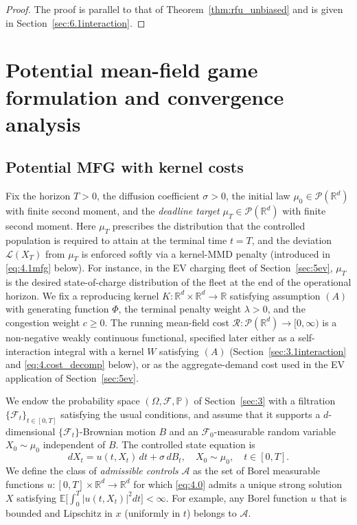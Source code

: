 \documentclass[11pt,leqno]{article}
\theoremstyle{plain}
\theoremstyle{remark}
\theoremstyle{definition}
\numberwithin{equation}{section}
\numberwithin{figure}{section}
\numberwithin{table}{section}
\numberwithin{algorithm}{section}
\newcommand{\EE}{\mathbb{E}}
\newcommand{\RR}{\mathbb{R}}
\newcommand{\PP}{\mathbb{P}}
\newcommand{\cP}{\mathcal{P}}
\begin{document}
\begin{proof}
The proof is parallel to that of Theorem~\ref{thm:rfu_unbiased}
and is given in Section~\ref{sec:6.1interaction}.
\end{proof}


\section{Potential mean-field game formulation and convergence analysis}\label{sec:4}

\subsection{Potential MFG with kernel costs}\label{sec:4.1mfg}

Fix the horizon $T>0$, the diffusion coefficient $\sigma>0$,
the initial law $\mu_0\in\cP(\RR^d)$ with finite second moment,
and the \emph{deadline target} $\mu_T\in\cP(\RR^d)$ with finite second moment.
Here $\mu_T$ prescribes the distribution that the controlled population is required
to attain at the terminal time $t=T$,
and the deviation $\mathcal{L}(X_T)$ from $\mu_T$ is enforced softly via a kernel-MMD penalty
(introduced in \eqref{eq:4.1mfg} below).
For instance, in the EV charging fleet of Section~\ref{sec:5ev},
$\mu_T$ is the desired state-of-charge distribution of the fleet at the end of the operational horizon.
We fix a reproducing kernel $K:\RR^d\times\RR^d\to\RR$ satisfying assumption $(A)$
with generating function $\Phi$, the terminal penalty weight $\lambda>0$, and the congestion weight $c\ge 0$.
The running mean-field cost $\mathcal{R}:\cP(\RR^d)\to[0,\infty)$ is a non-negative weakly continuous functional,
specified later either as a self-interaction integral with a kernel $W$ satisfying $(A)$
(Section~\ref{sec:3.1interaction} and \eqref{eq:4.cost_decomp} below),
or as the aggregate-demand cost used in the EV application of Section~\ref{sec:5ev}.

We endow the probability space $(\Omega,\mathcal{F},\PP)$ of Section~\ref{sec:3}
with a filtration $\{\mathcal{F}_t\}_{t\in[0,T]}$ satisfying the usual conditions,
and assume that it supports a $d$-dimensional $\{\mathcal{F}_t\}$-Brownian motion $B$
and an $\mathcal{F}_0$-measurable random variable $X_0\sim\mu_0$ independent of $B$.
The controlled state equation is
\begin{equation}\label{eq:4.0}
 dX_t = u(t,X_t)\,dt + \sigma\,dB_t,\quad X_0\sim\mu_0,\quad t\in[0,T].
\end{equation}
We define the class of \emph{admissible controls} $\mathcal{A}$
as the set of Borel measurable functions $u:[0,T]\times\RR^d\to\RR^d$
for which \eqref{eq:4.0} admits a unique strong solution $X$
satisfying $\EE\bigl[\int_0^T|u(t,X_t)|^2 dt\bigr]<\infty$.
For example, any Borel function $u$ that is bounded and Lipschitz in $x$ (uniformly in $t$) belongs to $\mathcal{A}$.
\end{document}
